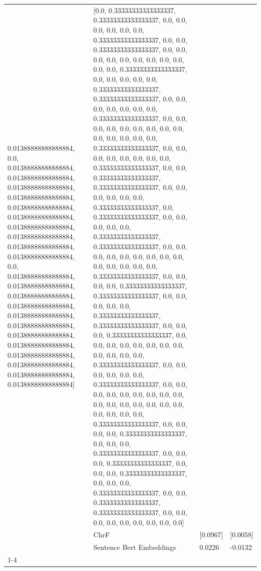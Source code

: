 \begin{tabular}{llll}
0.01388888888888884, 0.0, 0.01388888888888884, 0.01388888888888884, 0.01388888888888884, 0.01388888888888884, 0.01388888888888884, 0.01388888888888884, 0.01388888888888884, 0.01388888888888884, 0.01388888888888884, 0.01388888888888884, 0.0, 0.01388888888888884, 0.01388888888888884, 0.01388888888888884, 0.01388888888888884, 0.01388888888888884, 0.01388888888888884, 0.01388888888888884, 0.01388888888888884, 0.01388888888888884, 0.01388888888888884, 0.01388888888888884, 0.01388888888888884] & [0.0, 0.33333333333333337, 0.33333333333333337, 0.0, 0.0, 0.0, 0.0, 0.0, 0.0, 0.33333333333333337, 0.0, 0.0, 0.33333333333333337, 0.0, 0.0, 0.0, 0.0, 0.0, 0.0, 0.0, 0.0, 0.0, 0.0, 0.0, 0.33333333333333337, 0.0, 0.0, 0.0, 0.0, 0.0, 0.33333333333333337, 0.33333333333333337, 0.0, 0.0, 0.0, 0.0, 0.0, 0.0, 0.0, 0.33333333333333337, 0.0, 0.0, 0.0, 0.0, 0.0, 0.0, 0.0, 0.0, 0.0, 0.0, 0.0, 0.0, 0.0, 0.0, 0.33333333333333337, 0.0, 0.0, 0.0, 0.0, 0.0, 0.0, 0.0, 0.0, 0.33333333333333337, 0.0, 0.0, 0.33333333333333337, 0.33333333333333337, 0.0, 0.0, 0.0, 0.0, 0.0, 0.0, 0.33333333333333337, 0.0, 0.33333333333333337, 0.0, 0.0, 0.0, 0.0, 0.0, 0.33333333333333337, 0.33333333333333337, 0.0, 0.0, 0.0, 0.0, 0.0, 0.0, 0.0, 0.0, 0.0, 0.0, 0.0, 0.0, 0.0, 0.0, 0.33333333333333337, 0.0, 0.0, 0.0, 0.0, 0.33333333333333337, 0.33333333333333337, 0.0, 0.0, 0.0, 0.0, 0.0, 0.33333333333333337, 0.33333333333333337, 0.0, 0.0, 0.0, 0.33333333333333337, 0.0, 0.0, 0.0, 0.0, 0.0, 0.0, 0.0, 0.0, 0.0, 0.0, 0.0, 0.0, 0.33333333333333337, 0.0, 0.0, 0.0, 0.0, 0.0, 0.0, 0.33333333333333337, 0.0, 0.0, 0.0, 0.0, 0.0, 0.0, 0.0, 0.0, 0.0, 0.0, 0.0, 0.0, 0.0, 0.0, 0.0, 0.0, 0.0, 0.0, 0.0, 0.0, 0.33333333333333337, 0.0, 0.0, 0.0, 0.0, 0.33333333333333337, 0.0, 0.0, 0.0, 0.33333333333333337, 0.0, 0.0, 0.0, 0.33333333333333337, 0.0, 0.0, 0.0, 0.33333333333333337, 0.0, 0.0, 0.0, 0.33333333333333337, 0.0, 0.0, 0.33333333333333337, 0.33333333333333337, 0.0, 0.0, 0.0, 0.0, 0.0, 0.0, 0.0, 0.0, 0.0] \\
 & ChrF & [0.0967] & [0.0058] \\
 & Sentence Bert Embeddings & 0.0226 & -0.0132 \\
\cline{1-4}

\end{tabular}
